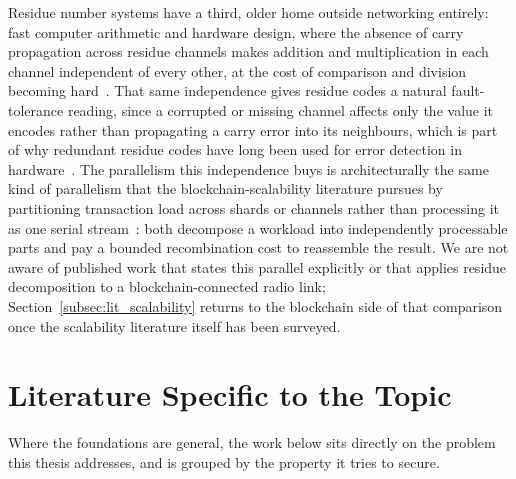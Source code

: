 \documentclass[12pt,a4paper,oneside]{book}
\begin{document}
Residue number systems have a third, older home outside networking
entirely: fast computer arithmetic and hardware design, where the absence
of carry propagation across residue channels makes addition and
multiplication in each channel independent of every other, at the cost of
comparison and division becoming hard~\cite{ding1996remainder,
parhami2010computer}. That same independence gives residue codes a natural
fault-tolerance reading, since a corrupted or missing channel affects only
the value it encodes rather than propagating a carry error into its
neighbours, which is part of why redundant residue codes have long been
used for error detection in
hardware~\cite{knuth1997art, hardy2008introduction}. The parallelism this
independence buys is architecturally the same kind of parallelism that the
blockchain-scalability literature pursues by partitioning transaction load
across shards or channels rather than processing it as one serial
stream~\cite{horvath2025assistedsharding, anonndoptimizedcloud}: both
decompose a workload into independently processable parts and pay a
bounded recombination cost to reassemble the result. We are not aware of
published work that states this parallel explicitly or that applies
residue decomposition to a blockchain-connected radio link;
Section~\ref{subsec:lit_scalability} returns to the blockchain side of
that comparison once the scalability literature itself has been surveyed.

\section{Literature Specific to the Topic}
\label{sec:lit_specific_topic}

Where the foundations are general, the work below sits directly on the
problem this thesis addresses, and is grouped by the property it tries to
secure.

\label{subsec:lit_blockchain_ag}
\end{document}
